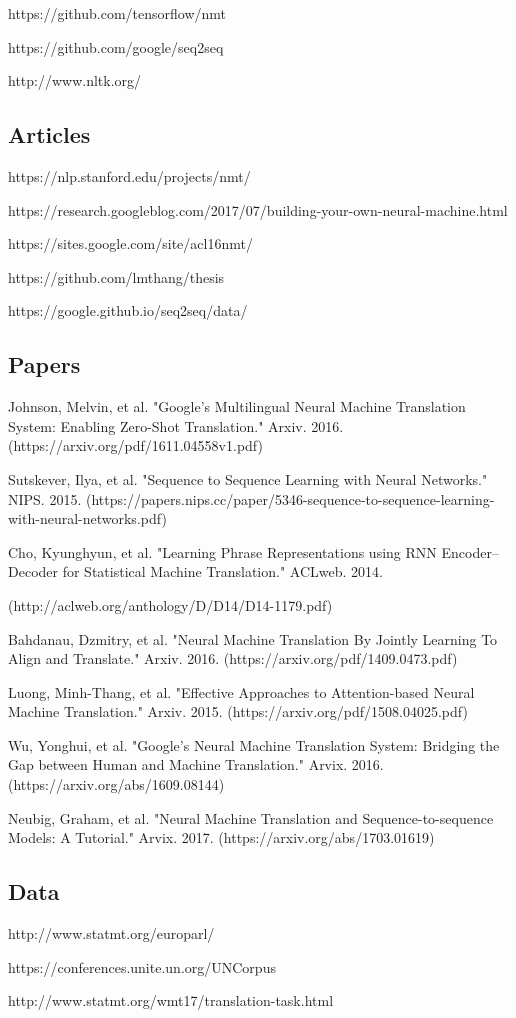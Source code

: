 \documentclass[10pt,a4paper]{article}
\begin{document}
https://github.com/tensorflow/nmt

https://github.com/google/seq2seq

http://www.nltk.org/

\subsection{Articles}

https://nlp.stanford.edu/projects/nmt/

https://research.googleblog.com/2017/07/building-your-own-neural-machine.html

https://sites.google.com/site/acl16nmt/

https://github.com/lmthang/thesis

https://google.github.io/seq2seq/data/

\subsection{Papers}

Johnson, Melvin, et al. "Google’s Multilingual Neural Machine Translation System: Enabling Zero-Shot Translation." Arxiv. 2016.
(https://arxiv.org/pdf/1611.04558v1.pdf)
\newline

Sutskever, Ilya, et al. "Sequence to Sequence Learning with Neural Networks." NIPS. 2015.
(https://papers.nips.cc/paper/5346-sequence-to-sequence-learning-with-neural-networks.pdf)
\newline

Cho, Kyunghyun, et al. "Learning Phrase Representations using RNN Encoder–Decoder for Statistical Machine Translation." ACLweb. 2014.

(http://aclweb.org/anthology/D/D14/D14-1179.pdf)
\newline

Bahdanau, Dzmitry, et al. "Neural Machine Translation By Jointly Learning To Align and Translate." Arxiv. 2016.
(https://arxiv.org/pdf/1409.0473.pdf)
\newline

Luong, Minh-Thang, et al. "Effective Approaches to Attention-based Neural Machine Translation." Arxiv. 2015.
(https://arxiv.org/pdf/1508.04025.pdf)
\newline

Wu, Yonghui, et al. "Google’s Neural Machine Translation System: Bridging the Gap between Human and Machine Translation." Arvix. 2016.
(https://arxiv.org/abs/1609.08144)
\newline

Neubig, Graham, et al. "Neural Machine Translation and Sequence-to-sequence Models: A Tutorial." Arvix. 2017.
(https://arxiv.org/abs/1703.01619)
\newline


\subsection{Data}

http://www.statmt.org/europarl/

https://conferences.unite.un.org/UNCorpus

http://www.statmt.org/wmt17/translation-task.html
\end{document}
